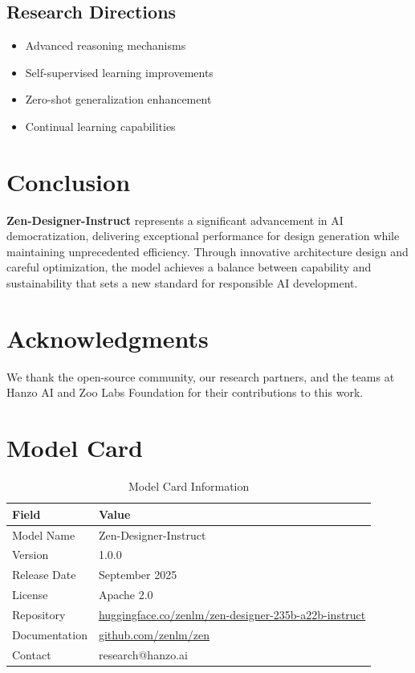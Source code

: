 \documentclass[11pt,a4paper]{article}
\begin{document}
\subsection{Research Directions}
\begin{itemize}
    \item Advanced reasoning mechanisms
    \item Self-supervised learning improvements
    \item Zero-shot generalization enhancement
    \item Continual learning capabilities
\end{itemize}

\section{Conclusion}

\textbf{Zen-Designer-Instruct} represents a significant advancement in AI democratization, 
delivering exceptional performance for design generation while maintaining 
unprecedented efficiency. Through innovative architecture design and careful optimization, 
the model achieves a balance between capability and sustainability that sets a new standard 
for responsible AI development.

\section*{Acknowledgments}

We thank the open-source community, our research partners, and the teams at Hanzo AI and 
Zoo Labs Foundation for their contributions to this work.

\appendix

\section{Model Card}

\begin{table}[H]
\centering
\begin{tabular}{ll}
\toprule
\textbf{Field} & \textbf{Value} \\
\midrule
Model Name & Zen-Designer-Instruct \\
Version & 1.0.0 \\
Release Date & September 2025 \\
License & Apache 2.0 \\
Repository & \href{https://huggingface.co/zenlm/zen-designer-235b-a22b-instruct}{huggingface.co/zenlm/zen-designer-235b-a22b-instruct} \\
Documentation & \href{https://github.com/zenlm/zen}{github.com/zenlm/zen} \\
Contact & research@hanzo.ai \\
\bottomrule
\end{tabular}
\caption{Model Card Information}
\end{table}
\end{document}
